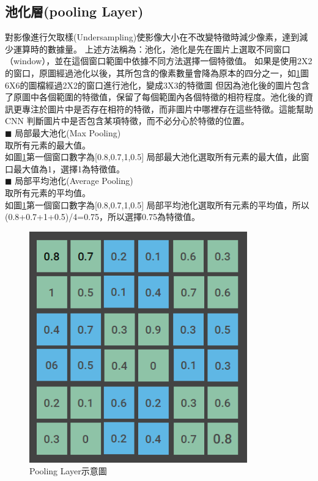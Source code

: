 \subsection{池化層(pooling Layer)}
對影像進行欠取樣(Undersampling)使影像大小在不改變特徵時減少像素，達到減少運算時的數據量。
上述方法稱為：池化，池化是先在圖片上選取不同窗口（window），並在這個窗口範圍中依據不同方法選擇一個特徵值。
如果是使用2X2的窗口，原圖經過池化以後，其所包含的像素數量會降為原本的四分之一，如\ref{fig:Pooling Layer}圖6X6的圖檔經過2X2的窗口進行池化，變成3X3的特徵圖
但因為池化後的圖片包含了原圖中各個範圍的特徵值，保留了每個範圍內各個特徵的相符程度。池化後的資訊更專注於圖片中是否存在相符的特徵，而非圖片中哪裡存在這些特徵。這能幫助 CNN 判斷圖片中是否包含某項特徵，而不必分心於特徵的位置。\\
◼ 局部最大池化(Max Pooling)\\
取所有元素的最大值。\\
如圖\ref{fig:Pooling Layer}第一個窗口數字為[0.8,0.7,1,0.5] 局部最大池化選取所有元素的最大值，此窗口最大值為1，選擇1為特徵值。\\
◼ 局部平均池化(Average Pooling)\\
取所有元素的平均值。\\
如圖\ref{fig:Pooling Layer}第一個窗口數字為[0.8,0.7,1,0.5] 局部平均池化選取所有元素的平均值，所以(0.8+0.7+1+0.5)/4=0.75，所以選擇0.75為特徵值。\\
\begin{figure}[H]
	\centerline{\includegraphics[height=10cm]{pic/pooling 1.PNG}}

	\caption{Pooling Layer示意圖}
	\label{fig:Pooling Layer}
\end{figure}
